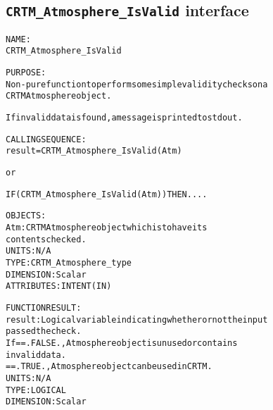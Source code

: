 \subsection{\texttt{CRTM\_Atmosphere\_IsValid} interface}
  \label{sec:CRTM_Atmosphere_IsValid_interface}
  \begin{alltt}
 
  NAME:
        CRTM_Atmosphere_IsValid
 
  PURPOSE:
        Non-pure function to perform some simple validity checks on a
        CRTM Atmosphere object.
 
        If invalid data is found, a message is printed to stdout.
 
  CALLING SEQUENCE:
        result = CRTM_Atmosphere_IsValid( Atm )
 
          or
 
        IF ( CRTM_Atmosphere_IsValid( Atm ) ) THEN....
 
  OBJECTS:
        Atm:       CRTM Atmosphere object which is to have its
                   contents checked.
                   UNITS:      N/A
                   TYPE:       CRTM_Atmosphere_type
                   DIMENSION:  Scalar
                   ATTRIBUTES: INTENT(IN)
 
  FUNCTION RESULT:
        result:    Logical variable indicating whether or not the input
                   passed the check.
                   If == .FALSE., Atmosphere object is unused or contains
                                  invalid data.
                      == .TRUE.,  Atmosphere object can be used in CRTM.
                   UNITS:      N/A
                   TYPE:       LOGICAL
                   DIMENSION:  Scalar
 
  \end{alltt}
